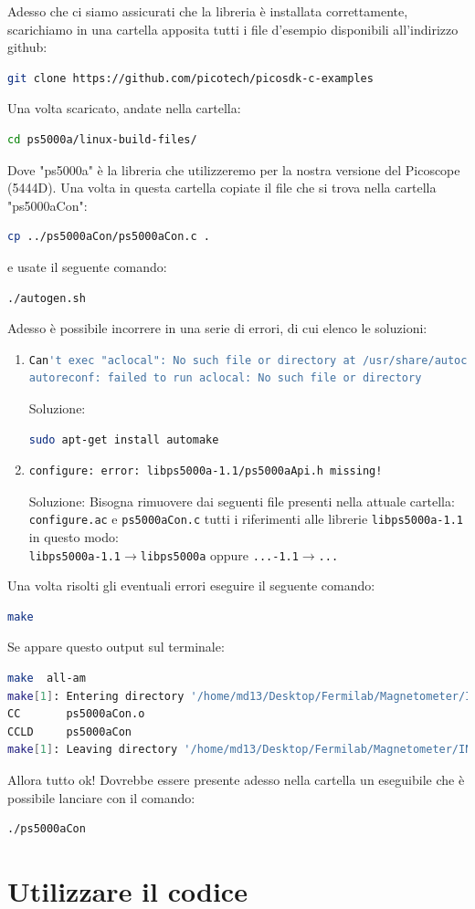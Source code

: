 \documentclass[a4paper]{article}
\begin{document}
Adesso che ci siamo assicurati che la libreria è installata correttamente, scarichiamo in una cartella apposita tutti i file d'esempio disponibili all'indirizzo github:
\begin{lstlisting}[language=bash]
git clone https://github.com/picotech/picosdk-c-examples
\end{lstlisting}
Una volta scaricato, andate nella cartella:
\begin{lstlisting}[language=bash]
cd ps5000a/linux-build-files/
\end{lstlisting}
Dove "ps5000a" è la libreria che utilizzeremo per la nostra versione del Picoscope (5444D). Una volta in questa cartella copiate il file che si trova nella cartella "ps5000aCon":
\begin{lstlisting}[language=bash]
cp ../ps5000aCon/ps5000aCon.c .
\end{lstlisting}
e usate il seguente comando:
\begin{lstlisting}[language=bash]
./autogen.sh
\end{lstlisting}
Adesso è possibile incorrere in una serie di errori, di cui elenco le soluzioni:
\begin{enumerate}
\item \begin{lstlisting}[language=bash]
Can't exec "aclocal": No such file or directory at /usr/share/autoconf/Autom4te/FileUtils.pm line 326.
autoreconf: failed to run aclocal: No such file or directory
\end{lstlisting}
Soluzione:
\begin{lstlisting}[language=bash]
sudo apt-get install automake
\end{lstlisting}

\item \begin{lstlisting}[language=bash]
configure: error: libps5000a-1.1/ps5000aApi.h missing!
\end{lstlisting}
Soluzione:
Bisogna rimuovere dai seguenti file presenti nella attuale cartella: \verb|configure.ac| e \verb|ps5000aCon.c| tutti i riferimenti alle librerie \verb|libps5000a-1.1| in questo modo:\\
\verb|libps5000a-1.1|$\to$\verb|libps5000a| oppure \verb|...-1.1|$\to$\verb|...|
\end{enumerate}
Una volta risolti gli eventuali errori eseguire il seguente comando:
\begin{lstlisting}[language=bash]
make
\end{lstlisting}
Se appare questo output sul terminale:
\begin{lstlisting}[language=bash]
make  all-am
make[1]: Entering directory '/home/md13/Desktop/Fermilab/Magnetometer/INO/picosdk_C/ps5000a/linux-build-files'
CC       ps5000aCon.o
CCLD     ps5000aCon
make[1]: Leaving directory '/home/md13/Desktop/Fermilab/Magnetometer/INO/picosdk_C/ps5000a/linux-build-files'
\end{lstlisting}
Allora tutto ok! Dovrebbe essere presente adesso nella cartella un eseguibile che è possibile lanciare con il comando:
\begin{lstlisting}[language=bash]
./ps5000aCon
\end{lstlisting}


\section{Utilizzare il codice}
\end{document}
